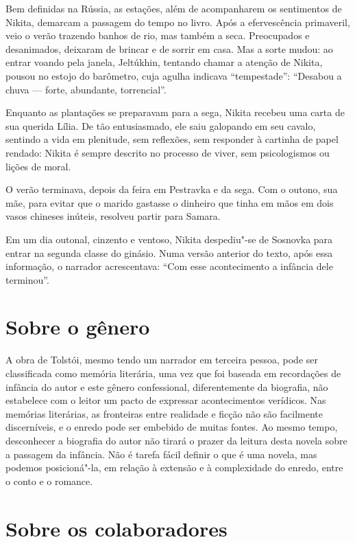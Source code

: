 Bem definidas na Rússia, as estações, além de acompanharem os
sentimentos de Nikita, demarcam a passagem do tempo no livro. Após a
efervescência primaveril, veio o verão trazendo banhos de rio, mas
também a seca. Preocupados e desanimados, deixaram de brincar e de
sorrir em casa. Mas a sorte mudou: ao entrar voando pela janela,
Jeltúkhin, tentando chamar a atenção de Nikita, pousou no estojo do
barômetro, cuja agulha indicava ``tempestade'': ``Desabou a chuva ---
forte, abundante, torrencial''.

Enquanto as plantações se preparavam para a sega, Nikita recebeu uma
carta de sua querida Lília. De tão entusiasmado, ele saiu galopando em
seu cavalo, sentindo a vida em plenitude, sem reflexões, sem responder à
cartinha de papel rendado: Nikita é sempre descrito no processo de
viver, sem psicologismos ou lições de moral.

O verão terminava, depois da feira em Pestravka e da sega. Com o outono,
sua mãe, para evitar que o marido gastasse o dinheiro que tinha em mãos
em dois vasos chineses inúteis, resolveu partir para Samara.

Em um dia outonal, cinzento e ventoso, Nikita despediu"-se de Sosnovka
para entrar na segunda classe do ginásio. Numa versão anterior do texto,
após essa informação, o narrador acrescentava: ``Com esse acontecimento
a infância dele terminou''.

\section{Sobre o gênero}\label{para3}

A obra de Tolstói, mesmo tendo um narrador em terceira pessoa, pode ser
classificada como memória literária, uma vez que foi baseada em
recordações de infância do autor e este gênero confessional,
diferentemente da biografia, não estabelece com o leitor um pacto de
expressar acontecimentos verídicos. Nas memórias literárias, as
fronteiras entre realidade e ficção não são facilmente discerníveis, e o
enredo pode ser embebido de muitas fontes. Ao mesmo tempo, desconhecer
a biografia do autor não tirará o prazer da leitura desta novela sobre a
passagem da infância. Não é tarefa fácil definir o que é uma novela, mas
podemos posicioná"-la, em relação à extensão e à complexidade do enredo,
entre o conto e o romance.

\section{Sobre os colaboradores}


